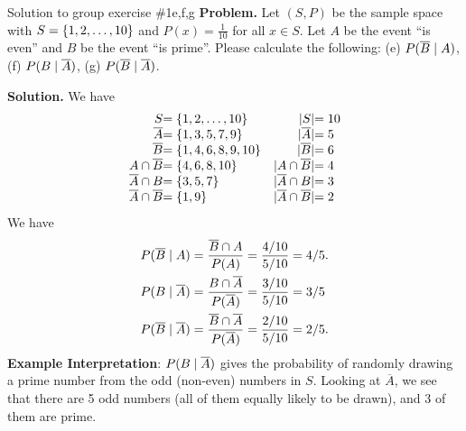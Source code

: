\documentclass[10pt]{beamer}
\begin{document}
\begin{frame}{Solution to group exercise \#1e,f,g}
\footnotesize 
\textbf{Problem.}  Let $(S,P)$ be the sample space with $S=\{ {1,2,\hdots, 10} \}$ and $P(x) =\frac{1}{10}$ for all $x \in S$.  Let $A$ be the event \enquote{is even} and $B$ be the event \enquote{is prime}.  Please calculate the following: (e) $P(\overline{B} \; | \; A)$, (f) $P(B \; | \; \overline{A})$, (g) $P(\overline{B} \; | \; \overline{A})$.
		
\vfill 

\textbf{Solution.}
We have 
\[
\begin{array}{r@{}l r@{}l}
S &= \set{1,2,\hdots, 10} & |S| &= 10 \\
\overline{A} &= \set{1,3,5,7,9} & |\overline{A}| &= 5 \\
\overline{B} &= \set{1,4,6,8,9,10} & |\overline{B}| &= 6 \\
A \cap \overline{B} &= \set{4,6,8,10} & |A \cap \overline{B}| &= 4 \\
\overline{A} \cap B &= \set{3,5,7} & |\overline{A} \cap B | &= 3 \\
\overline{A} \cap \overline{B} &= \set{1,9} & |\overline{A} \cap  \overline{B} | &= 2
\end{array}
\]
%
We have 
%
\begin{align*}
P(\overline{B} \; | \; A) &= \frac{\overline{B} \cap A}{P(A)} = \frac{4/10}{5/10} = 4/5. \\
P(B \; | \; \overline{A}) &= \frac{B \cap \overline{A}}{P(\overline{A})} = \frac{3/10}{5/10} = 3/5 \\
P(\overline{B} \; | \; \overline{A}) &= \frac{\overline{B} \cap \overline{A}}{P(\overline{A})} = \frac{2/10}{5/10} = 2/5.
\end{align*}
%
\vfill 
\textbf{Example Interpretation}: $P(B \; | \; \overline{A})$ gives the probability of randomly drawing a prime number from the odd (non-even) numbers in $S$.  Looking at $\overline{A}$, we see that there are 5 odd numbers (all of them equally likely to be drawn), and 3 of them are prime.
\end{frame}
\end{document}
